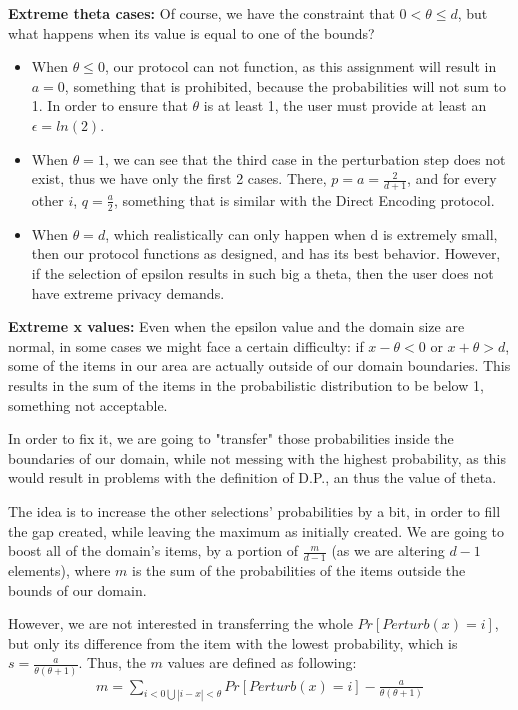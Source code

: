 \textbf{Extreme theta cases:} Of course, we have the constraint that $0 < \theta \leq d$, but what happens when its value is equal to one of the bounds?
\begin{itemize}
    \item When $\theta \leq 0$, our protocol can not function, as this assignment will result in $a = 0$, something that is prohibited, because the probabilities will not sum to 1. In order to ensure that $\theta$ is at least 1, the user must provide at least an $\epsilon = ln(2)$.
    
    \item When $\theta = 1$, we can see that the third case in the perturbation step does not exist, thus we have only the first 2 cases. There, $p = a = \frac{2}{d+1}$, and for every other $i$, $q = \frac{a}{2}$, something that is similar with the Direct Encoding protocol.
    
    \item When $\theta = d$, which realistically can only happen when d is extremely small, then our protocol functions as designed, and has its best behavior. However, if the selection of epsilon results in such big a theta, then the user does not have extreme privacy demands.
\end{itemize}

\textbf{Extreme x values:} Even when the epsilon value and the domain size are normal, in some cases we might face a certain difficulty: if $x - \theta < 0$ or $x + \theta > d$, some of the items in our area are actually outside of our domain boundaries. This results in the sum of the items in the probabilistic distribution to be below 1, something not acceptable. 

In order to fix it, we are going to "transfer" those probabilities inside the boundaries of our domain, while not messing with the highest probability, as this would result in problems with the definition of D.P., an thus the value of theta. 

The idea is to increase the other selections' probabilities by a bit, in order to fill the gap created, while leaving the maximum as initially created. We are going to boost all of the domain's items, by a portion of $\frac{m}{d - 1}$ (as we are altering $d-1$ elements), where $m$ is the sum of the probabilities of the items outside the bounds of our domain. 

However, we are not interested in transferring the whole $Pr[Perturb(x) = i]$, but only its difference from the item with the lowest probability, which is $s =  \frac{a}{\theta(\theta+1)}$. Thus, the $m$ values are defined as following:
\begin{align*}
    m = \sum_{i < 0 \bigcup |i-x|<\theta} Pr[Perturb(x) = i] - \frac{a}{\theta(\theta+1)}
\end{align*}

